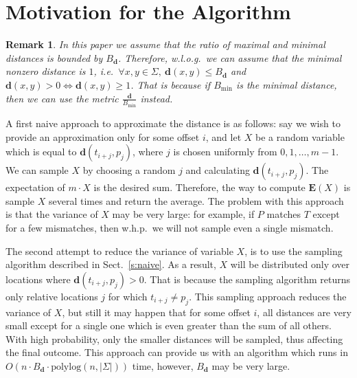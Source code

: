 \documentclass[11pt]{article}
\newtheorem{rem}[thm]{Remark}
\newcommand{\envert}[1]{\left\lvert#1\right\rvert}
\let\abs=\envert
\newcommand{\bfE}{\textbf{E}}
\newcommand{\dist}{\textbf{d}}
\begin{document}
\section{Motivation for the Algorithm}\label{s:Motiv}
\begin{rem}
In this paper we assume that the ratio of maximal and minimal
distances is bounded by $B_{\dist}$. Therefore, w.l.o.g.\ we can
assume that the minimal nonzero distance is $1$, i.e.\ $\forall
x,y \in \Sigma,\ \dist(x,y)\leq B_{\dist}$ and $\dist(x,y)>0 \iff
\dist(x,y) \geq 1$. That is because if $B_{\min}$ is the minimal
distance, then we can use the metric $\frac{\dist}{B_{\min}}$
instead.
\end{rem}
A first naive approach to approximate the distance is as follows:
say we wish to provide an approximation only for some offset $i$,
and let $X$ be a random variable which is equal to
$\dist(t_{i+j},p_j)$, where $j$ is chosen uniformly from
$0,1,\ldots,m-1$. We can sample $X$ by choosing a random $j$ and
calculating $\dist(t_{i+j},p_j)$. The expectation of $m \cdot X$ is
the desired sum. Therefore, the way to compute $\bfE(X)$ is sample
$X$ several times and return the average. The problem with this
approach is that the variance of $X$ may be very large: for example,
if $P$ matches $T$ except for a few mismatches, then w.h.p.\ we will
not sample even a single mismatch.

The second attempt to reduce the variance of variable $X$, is to
use the sampling algorithm described in Sect.~\ref{s:naive}. As a
result, $X$ will be distributed only over locations where
$\dist(t_{i+j},p_j)>0$. That is because the sampling algorithm
returns only relative locations $j$ for which $t_{i+j} \neq p_j$.
This sampling approach reduces the variance of $X$, but still it
may happen that for some offset $i$, all distances are very small
except for a single one which is even greater than the sum of all
others. With high probability, only the smaller distances will be
sampled, thus affecting the final outcome. This approach can
provide us with an algorithm which runs in $O(n\cdot
 B_{\dist}\cdot \mathrm{polylog}(n,\abs{\Sigma}))$ time, however,
$B_{\dist}$ may be very large.
\end{document}
